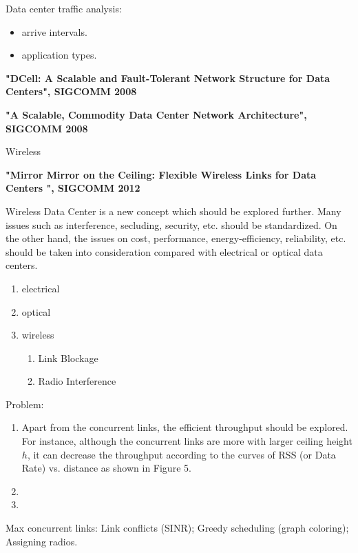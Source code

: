\documentclass[journal,onecolumn,11pt]{IEEEtran}
\begin{document}
Data center traffic analysis:
\begin{itemize}
  \item arrive intervals.
  \item application types.
\end{itemize}

\textbf{"DCell: A Scalable and Fault-Tolerant Network Structure for Data Centers", SIGCOMM 2008}

\textbf{"A Scalable, Commodity Data Center Network Architecture", SIGCOMM 2008}

Wireless

\textbf{"Mirror Mirror on the Ceiling: Flexible Wireless Links for Data Centers ", SIGCOMM 2012}

Wireless Data Center is a new concept which should be explored further. Many issues such as interference, secluding, security, etc. should be standardized. On the other hand, the issues on cost, performance, energy-efficiency, reliability, etc. should be taken into consideration compared with electrical or optical data centers.


\begin{enumerate}
  \item electrical
  \item optical
  \item wireless
  \begin{enumerate}
    \item Link Blockage
    \item Radio Interference
  \end{enumerate}
\end{enumerate}

Problem:
\begin{enumerate}
  \item Apart from the concurrent links, the efficient throughput should be explored. For instance, although the concurrent links are more with larger ceiling height $h$, it can decrease the throughput according to the curves of RSS (or Data Rate) vs. distance as shown in Figure 5.
  \item
  \item
\end{enumerate}

Max concurrent links: Link conflicts (SINR); Greedy scheduling (graph coloring); Assigning radios.
\end{document}
